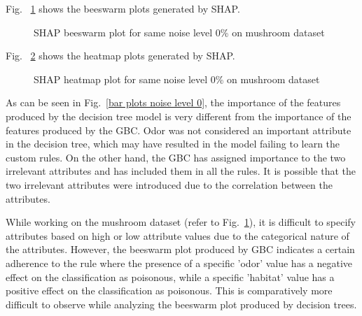 \documentclass[runningheads,a4paper]{llncs}
\begin{document}
Fig. ~\ref{bee plots noise level 0} shows the beeswarm plots generated by SHAP.
\begin{figure}[H]
	\centering
	
	\hfill
	
	
	\caption{SHAP beeswarm plot for same noise level 0\% on mushroom dataset}
	\label{bee plots noise level 0}

\end{figure}
Fig. ~\ref{heat plots noise level 0} shows the heatmap plots generated by SHAP.
\begin{figure}[H]
	\centering
	
	\hfill
	
	
	\caption{SHAP heatmap plot for same noise level 0\% on mushroom dataset}
	\label{heat plots noise level 0}
	
\end{figure}
As can be seen in Fig.~\ref{bar plots noise level 0}, the importance of the features produced by the decision tree model is very different from the importance of the features produced by the GBC.
Odor was not considered an important attribute in the decision tree, which may have resulted in the model failing to learn the custom rules. On the other hand, the GBC has assigned importance to the two irrelevant attributes and has included them in all the rules. It is possible that the two irrelevant attributes were introduced due to the correlation between the attributes.

While working on the mushroom dataset (refer to Fig.~\ref{bee plots noise level 0}), it is difficult to specify attributes based on high or low attribute values due to the categorical nature of the attributes. However, the beeswarm plot produced by GBC indicates a certain adherence to the rule where the presence of a specific 'odor' value has a negative effect on the classification as poisonous, while a specific 'habitat' value has a positive effect on the classification as poisonous. This is comparatively more difficult to observe while analyzing the beeswarm plot produced by decision trees.
\end{document}
